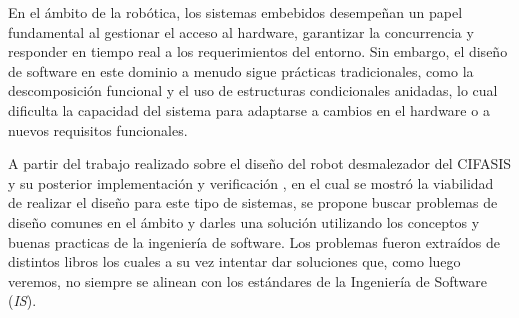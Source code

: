 %
%

En el ámbito de la robótica, los sistemas embebidos desempeñan un papel fundamental al gestionar el acceso al hardware, garantizar la concurrencia y responder en tiempo real a los requerimientos del entorno. Sin embargo, el diseño de software en este dominio a menudo sigue prácticas tradicionales, como la descomposición funcional y el uso de estructuras condicionales anidadas, lo cual dificulta la capacidad del sistema para adaptarse a cambios en el hardware o a nuevos requisitos funcionales.

A partir del trabajo realizado sobre el diseño del robot desmalezador del CIFASIS y su posterior implementación y verificación \cite{paperPomponio}, en el cual se mostró la viabilidad de realizar el diseño para este tipo de sistemas, se propone buscar problemas de diseño comunes en el ámbito y darles una solución utilizando los conceptos y buenas practicas de la ingeniería de software. Los problemas fueron extraídos de distintos libros \cite{douglass}\cite{elecia} los cuales a su vez intentar dar soluciones que, como luego veremos, no siempre se alinean con los estándares de la Ingeniería de Software (\textit{IS}).
